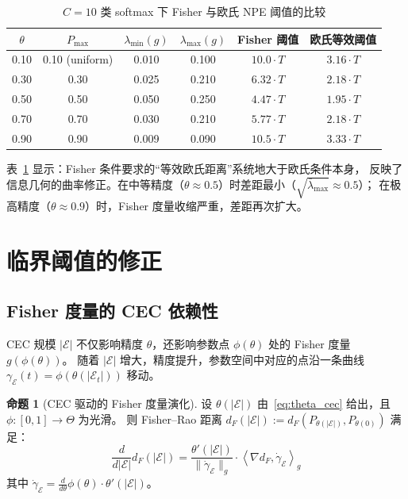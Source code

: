 \documentclass[12pt,a4paper]{article}
\theoremstyle{definition}
\newtheorem{proposition}{命题}[section]
\theoremstyle{remark}
\newcommand{\Fisher}{g}
\begin{document}
\begin{table}[htbp]
\centering
\caption{$C=10$ 类 softmax 下 Fisher 与欧氏 NPE 阈值的比较}
\label{tab:comparison}
\begin{tabular}{@{}cccccc@{}}
\toprule
$\theta$ & $P_{\max}$ & $\lambda_{\min}(\Fisher)$ & $\lambda_{\max}(\Fisher)$ & Fisher 阈值 & 欧氏等效阈值 \\
\midrule
0.10 & 0.10 (uniform) & 0.010 & 0.100 & $10.0 \cdot T$ & $3.16 \cdot T$ \\
0.30 & 0.30 & 0.025 & 0.210 & $6.32 \cdot T$ & $2.18 \cdot T$ \\
0.50 & 0.50 & 0.050 & 0.250 & $4.47 \cdot T$ & $1.95 \cdot T$ \\
0.70 & 0.70 & 0.030 & 0.210 & $5.77 \cdot T$ & $2.18 \cdot T$ \\
0.90 & 0.90 & 0.009 & 0.090 & $10.5 \cdot T$ & $3.33 \cdot T$ \\
\bottomrule
\end{tabular}
\end{table}

表~\ref{tab:comparison} 显示：Fisher 条件要求的“等效欧氏距离”系统地大于欧氏条件本身，
反映了信息几何的曲率修正。在中等精度（$\theta \approx 0.5$）时差距最小（$\sqrt{\bar{\lambda}_{\max}} \approx 0.5$）；
在极高精度（$\theta \approx 0.9$）时，Fisher 度量收缩严重，差距再次扩大。

\section{临界阈值的修正}

\subsection{Fisher 度量的 CEC 依赖性}

CEC 规模 $|\mathcal{E}|$ 不仅影响精度 $\theta$，还影响参数点 $\phi(\theta)$ 处的 Fisher 度量 $\Fisher(\phi(\theta))$。
随着 $|\mathcal{E}|$ 增大，精度提升，参数空间中对应的点沿一条曲线 $\gamma_{\mathcal{E}}(t) = \phi(\theta(|\mathcal{E}_t|))$ 移动。

\begin{proposition}[CEC 驱动的 Fisher 度量演化]
设 $\theta(|\mathcal{E}|)$ 由~\eqref{eq:theta_cec} 给出，且 $\phi: [0,1] \to \Theta$ 为光滑。
则 Fisher--Rao 距离 $d_F(|\mathcal{E}|) := d_F(P_{\theta(|\mathcal{E}|)}, P_{\theta(0)})$ 满足：
\begin{equation}
    \frac{d}{d|\mathcal{E}|} d_F(|\mathcal{E}|) = \frac{\theta'(|\mathcal{E}|)}{\|\dot{\gamma}_{\mathcal{E}}\|_{\Fisher}}
    \cdot \left\langle \nabla d_F, \dot{\gamma}_{\mathcal{E}} \right\rangle_{\Fisher} \label{eq:dF_deriv}
\end{equation}
其中 $\dot{\gamma}_{\mathcal{E}} = \frac{d}{d\theta} \phi(\theta) \cdot \theta'(|\mathcal{E}|)$。
\end{proposition}
\end{document}
